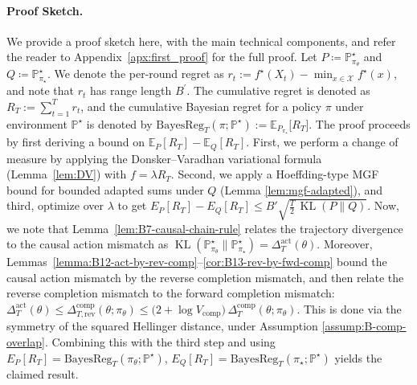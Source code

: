 \documentclass[11pt]{article}
\renewcommand{\P}{\mathbb{P}}
\providecommand{\E}{\mathbb{E}}
\DeclareMathOperator{\KL}{KL}
\providecommand{\BReg}{\mathrm{BayesReg}}
\begin{document}
\paragraph{Proof Sketch.}
We provide a proof sketch here, with the main technical components, and refer the reader to
Appendix~\ref{apx:first_proof} for the full proof. Let \(P\coloneqq \P^\star_{\pi_\theta}\) and \(Q\coloneqq \P^\star_{\pi_\star}\). We denote the per-round regret as $r_t := f^\star(X_t) - \min_{x \in \mathcal X}f^\star(x)$, and note that $r_t$ has range length $B^\prime$. The cumulative regret is denoted as $R_T := \sum_{t=1}^T r_t$, and the cumulative Bayesian regret for a policy $\pi$ under environment $\P^\star$ is denoted by $\mathrm{BayesReg}_T(\pi;\P^\star) := \mathbb E_{P_{\pi_\star}}\!\big[R_T\big]$. The proof proceeds by first deriving a bound on \(\E_{P}[R_T]-\E_{Q}[R_T].\) First, we perform a change of measure by applying the Donsker--Varadhan variational formula (Lemma~\ref{lem:DV}) with $f=\lambda R_T$. Second, we apply a Hoeffding-type MGF bound for bounded adapted sums under $Q$ (Lemma \ref{lem:mgf-adapted}), and third, optimize over $\lambda$ to get \(E_P[R_T] - E_Q[R_T] \le B'\sqrt{\frac{T}{2}\,\KL(P\|Q)}\). Now, we note that Lemma~\ref{lem:B7-causal-chain-rule} relates the trajectory divergence to the causal action mismatch as $\KL(\P^\star_{\pi_\theta}\|\P^\star_{\pi_\star})=\Delta^{\mathrm{act}}_T(\theta)$. Moreover, Lemmas~\ref{lemma:B12-act-by-rev-comp}--\ref{cor:B13-rev-by-fwd-comp} bound the causal action mismatch by the reverse
completion mismatch, and then relate the reverse completion mismatch to the forward completion mismatch:
\(
\Delta^{\mathrm{act}}_T(\theta)
\le
\Delta^{\mathrm{comp}}_{T,\mathrm{rev}}(\theta;\pi_\theta)
\le
\bigl(2+\log V_{\mathrm{comp}}\bigr)\,\Delta^{\mathrm{comp}}_T(\theta;\pi_\theta)
\). This is done via the symmetry of the squared Hellinger distance, under Assumption \ref{assump:B-comp-overlap}. Combining this with the third step and using $E_P[R_T]=\BReg_T(\pi_\theta;\P^\star)$,
$E_Q[R_T]=\BReg_T(\pi_\star;\P^\star)$ yields the claimed result.
\end{document}
